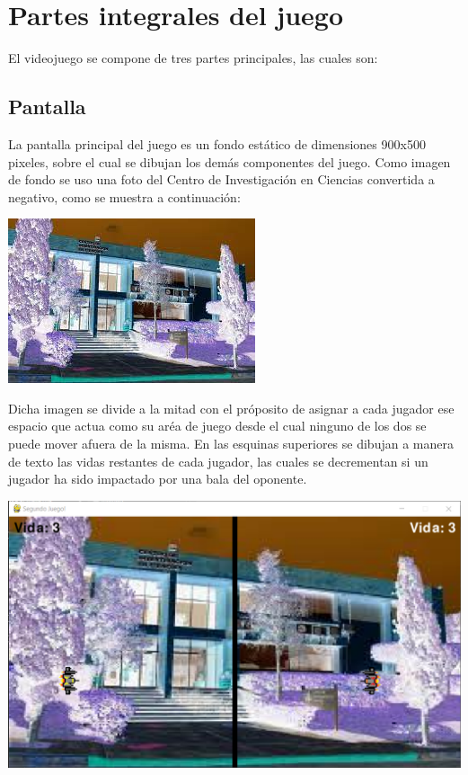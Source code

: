\documentclass[12pt,letterpaper]{report}
\begin{document}
\section{Partes integrales del juego}
El videojuego se compone de tres partes principales, las cuales son:

\subsection{Pantalla}
La pantalla principal del juego es un fondo estático de dimensiones 900x500 pixeles, sobre el cual se dibujan los demás componentes del juego. Como imagen de fondo se uso una foto del Centro de Investigación en Ciencias convertida a negativo, como se muestra a continuación:
\begin{center}
\includegraphics[scale=0.5]{negative_cinc.png} 
\end{center} 
Dicha imagen se divide a la mitad con el próposito de asignar a cada jugador ese espacio que actua como su aréa de juego desde el cual ninguno de los dos se puede mover afuera de la misma.\newline
En las esquinas superiores se dibujan a manera de texto las vidas restantes de cada jugador, las cuales se decrementan si un jugador ha sido impactado por una bala del oponente. 
\begin{center}
\includegraphics[scale=0.75]{execute_order_66.png} 
\end{center}
\end{document}
